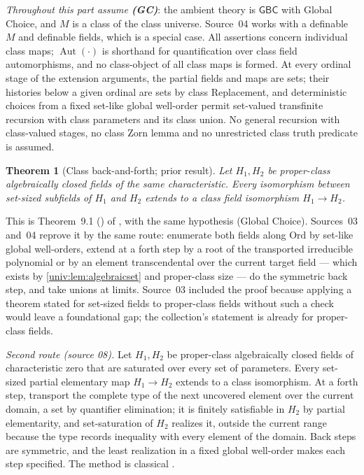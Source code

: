 \documentclass[11pt,letterpaper]{article}
\numberwithin{equation}{section}
\newtheorem{theorem}{Theorem}[section]
\theoremstyle{definition}
\theoremstyle{remark}
\newcommand{\Ord}{\mathrm{Ord}}
\newcommand{\Aut}{\operatorname{Aut}}
\newcommand{\GBC}{\mathsf{GBC}}
\begin{document}
\emph{Throughout this part assume \textbf{(GC)}}: the ambient theory is
$\GBC$ with Global Choice, and $M$ is a class of the class universe. Source~04
works with a definable $M$ and definable fields, which is a special case. All
assertions concern individual class maps; $\Aut(\cdot)$ is shorthand for
quantification over class field automorphisms, and no class-object of all class
maps is formed. At every ordinal stage of the extension arguments, the partial
fields and maps are sets; their histories below a given ordinal are sets by
class Replacement, and deterministic choices from a fixed set-like global
well-order permit set-valued transfinite recursion with class parameters and
its class union. No general recursion with class-valued stages, no class Zorn
lemma and no unrestricted class truth predicate is assumed.

\begin{theorem}[Class back-and-forth; prior result]\label{univ:thm:classbf}
Let $H_1,H_2$ be proper-class algebraically closed fields of the same
characteristic. Every isomorphism between set-sized subfields of $H_1$ and
$H_2$ extends to a class field isomorphism $H_1\to H_2$.
\end{theorem}

This is Theorem~9.1 () of
, with the same
hypothesis (Global Choice). Sources~03 and~04 reprove it by the same route:
enumerate both fields along $\Ord$ by set-like global well-orders, extend at a
forth step by a root of the transported irreducible polynomial or by an element
transcendental over the current target field --- which exists by
\cref{univ:lem:algebraicset} and proper-class size --- do the symmetric back
step, and take unions at limits. Source~03 included the proof because applying
a theorem stated for set-sized fields to proper-class fields without such a
check would leave a foundational gap; the collection's statement is already
for proper-class fields.

\emph{Second route (source 08).} Let $H_1,H_2$ be proper-class algebraically
closed fields of characteristic zero that are saturated over every set of
parameters. Every set-sized partial elementary map $H_1\to H_2$ extends to a
class isomorphism. At a forth step, transport the complete type of the next
uncovered element over the current domain, a set by quantifier elimination;
it is finitely satisfiable in $H_2$ by partial elementarity, and set-saturation
of $H_2$ realizes it, outside the current range because the type records
inequality with every element of the domain. Back steps are symmetric, and the
least realization in a fixed global well-order makes each step specified. The
method is classical \cite{Ehrlich1989,vdDE2018}.
\end{document}

